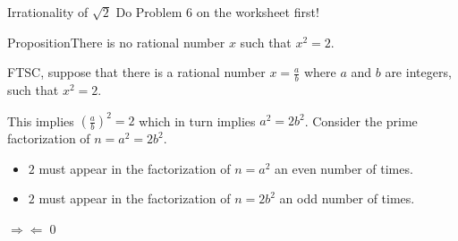 \documentclass{beamer}
\def\bl[#1]#2{\begin{block}{#1}#2\end{block}}
\def\itemb{\begin{itemize}}
\def\iteme{\end{itemize}}
\begin{document}
\begin{frame}{Irrationality of $\sqrt{2}$}
Do Problem 6 on the worksheet first!
\bl[Proposition]{There is no rational number $x$ such that $x^2=2$.}
FTSC, suppose that there is a rational number $x=\frac{a}{b}$ where $a$ and $b$ are integers, such that $x^2=2$.

This implies $\left(\frac{a}{b}\right)^2=2$ which in turn implies $a^2=2b^2$. Consider the prime factorization of $n=a^2=2b^2$.
\itemb
\item $2$ must appear in the factorization of $n=a^2$ an even number of times.
\item $2$ must appear in the factorization of $n=2b^2$ an odd number of times.
\iteme
$\Rightarrow\Leftarrow$\qed
\end{frame}
\end{document}
